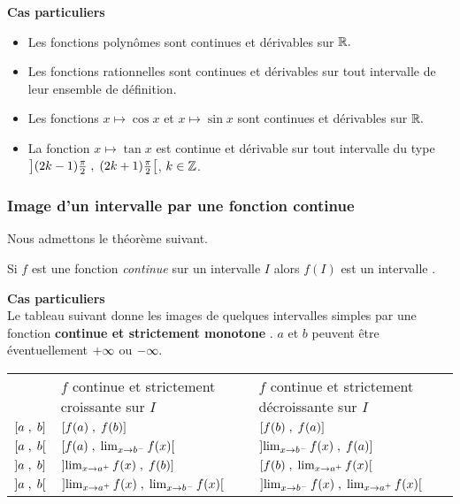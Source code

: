 \begin{example}
\textbf{Cas particuliers}
\begin{itemize}
\item Les fonctions polynômes sont continues et dérivables sur $ \mathbb{R}. $ 
\item Les fonctions rationnelles sont continues et dérivables sur tout intervalle de leur ensemble de définition.
\item Les fonctions $x\mapsto\cos x $ et  $x\mapsto\sin x $ sont continues et dérivables sur $ \mathbb{R}. $
\item La fonction $x\mapsto\tan x $ est continue et dérivable sur tout intervalle du type $\left](2k-1)\frac{\pi}{2} \;,\; (2k+1)\frac{\pi}{2}\right[$, $ k\in\mathbb{Z} $.

\end{itemize}
\subsubsection*{Image d'un intervalle par une fonction continue}
Nous admettons le théorème suivant.
\begin{theorem}
Si $ f $ est une fonction \emph{continue} sur  un intervalle $ I $ alors $ f(I) $ est un intervalle .
\end{theorem}
\textbf{Cas particuliers}\\
Le tableau suivant donne les images de quelques intervalles simples par une fonction \textbf{continue et strictement monotone }.  $ a$ et $b $ peuvent être éventuellement $+\infty $ ou $-\infty .$ 

\begin{tabularx}{\textwidth}{|>{\centering\arraybackslash}p{1cm}|>{\centering\arraybackslash}X|>{\centering\arraybackslash}X|}
\cline{1-3}
\multicolumn{1}{|c|}{} & \multicolumn{2}{c|}{$ f(I) $} \\
\cline{2-3}
\multicolumn{1}{|c|}{$I$ intervalle} & $f$ continue et strictement croissante sur $ I $ &  $ f $ continue et strictement décroissante sur $ I $ \\
\hline
 $\left[a\;,\; b\right]$ & $\left[f(a)\;,\; f(b)\right]$ & $\left[f(b)\;,\; f(a)\right]$ \\
\hline
$ \left[a \;,\; b\right[$ & $\small \left[f(a) \;,\;  \lim_{x \to b^{-}}f(x)\right[$ & $\small\left]\lim_{x \to b^{-}}f(x)  \;, \;f(a)\right]$ \\
\hline
$ \left]a \;, \;b\right]$ & $\small\left]\lim_{x \to a^{+}}f(x) \;, \;f(b)\right]$ & $\small\left[f(b) \;,\; \lim_{x \to a^{+}}f(x)\right[$ \\
\hline
$ \left]a \;,\; b\right[$ & $\small\left]\lim_{x \to a^{+}}f(x) \;,\; \lim_{x \to b^{-}}f(x)\right[$ & $\small\left]\lim_{x \to b^{-}}f(x) \;,\; \lim_{x \to a^{+}}f(x)\right[$ \\
\hline
\end{tabularx}


\end{example}
